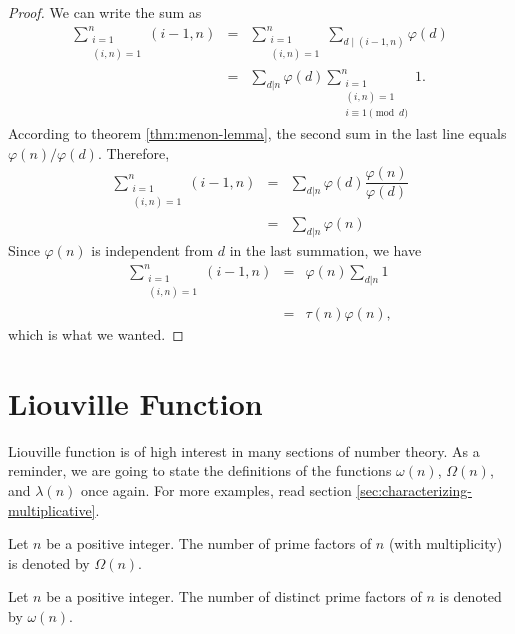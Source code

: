 \documentclass[12pt]{subfile}
\begin{document}
		\begin{proof}
			We can write the sum as
				\begin{eqnarray*}
					\sum\limits_{\substack{i=1\\(i,n)=1}}^{n}(i-1,n)
					& = & \sum\limits_{\substack{i=1\\(i,n)=1}}^{n}\sum\limits_{d\mid(i-1,n)}\varphi(d)\\
					& = & \sum\limits_{d|n}\varphi(d)\sum\limits_{\substack{i=1\\(i,n)=1\\i\equiv 1\pmod d}}^n 1.
				\end{eqnarray*}
			According to theorem \ref{thm:menon-lemma}, the second sum in the last line equals $\varphi(n)/\varphi(d)$. Therefore,
				\begin{eqnarray*}
					\sum\limits_{\substack{i=1\\(i,n)=1}}^{n}(i-1,n)
					& = & \sum\limits_{d|n}\varphi(d)\dfrac{\varphi(n)}{\varphi(d)}\\
					& = & \sum\limits_{d|n}\varphi(n)
				\end{eqnarray*}
			Since $\varphi(n)$ is independent from $d$ in the last summation, we have
				\begin{eqnarray*}
					\sum\limits_{\substack{i=1\\(i,n)=1}}^{n}(i-1,n)
					& = & \varphi(n)\sum\limits_{d|n}1\\
					& = & \tau(n)\varphi(n),
				\end{eqnarray*}
			which is what we wanted.
		\end{proof}
\section{Liouville Function}
	Liouville function is of high interest in many sections of number theory. As a reminder, we are going to state the definitions of the functions $\omega(n)$, $\Omega(n)$, and $\lambda(n)$ once again. For more examples, read section \ref{sec:characterizing-multiplicative}.

	\begin{definition}
		Let $n$ be a positive integer. The number of prime factors of $n$ (with multiplicity) is denoted by $\Omega(n)$.
	\end{definition}

	\begin{definition}
		Let $n$ be a positive integer. The number of distinct prime factors of $n$ is denoted by $\omega(n)$.
	\end{definition}
\end{document}
